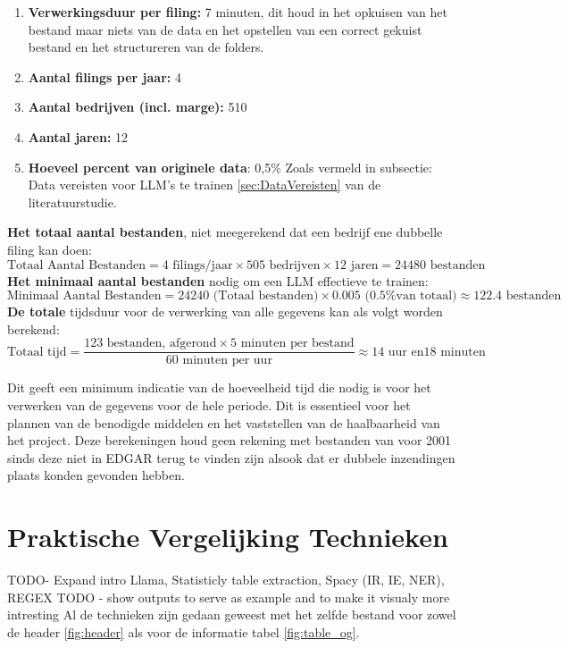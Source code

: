 \begin{enumerate}
    \item \textbf{Verwerkingsduur per filing:} 7 minuten, dit houd in het opkuisen van het bestand maar niets van de data en het opstellen van een correct gekuist bestand en het structureren van de folders.
    \item \textbf{Aantal filings per jaar:} 4
    \item \textbf{Aantal bedrijven (incl. marge):} 510
    \item \textbf{Aantal jaren:} 12
    \item \textbf{Hoeveel percent van originele data}: 0,5\% Zoals vermeld in subsectie: Data vereisten voor LLM's te trainen \ref{sec:DataVereisten} van de literatuurstudie.
\end{enumerate}

\textbf{Het totaal aantal bestanden}, niet meegerekend dat een bedrijf ene dubbelle filing kan doen:
\[
\text{Totaal Aantal Bestanden} = 4 \text{ filings/jaar} \times 505 \text{ bedrijven} \times 12 \text{ jaren} = 24480 \text{ bestanden}
\]
\textbf{Het minimaal aantal bestanden} nodig om een LLM effectieve te trainen:
\[
\text{Minimaal Aantal Bestanden} = 24240 \text{ (Totaal bestanden)} \times 0.005 \text{ (0.5\% van totaal)} \approx 122.4 \text{ bestanden}
\]
\textbf{De totale} tijdsduur voor de verwerking van alle gegevens kan als volgt worden berekend:
\[
\text{Totaal tijd} = \frac{123 \text{ bestanden, afgerond} \times 5 \text{ minuten per bestand}}{60 \text{ minuten per uur}} \approx 14 \text{ uur en}  18 \text{ minuten}
\]

Dit geeft een minimum indicatie van de hoeveelheid tijd die nodig is voor het verwerken van de gegevens voor de hele periode. Dit is essentieel voor het plannen van de benodigde middelen en het vaststellen van de haalbaarheid van het project. Deze berekeningen houd geen rekening met bestanden van voor 2001 sinds deze niet in EDGAR terug te vinden zijn alsook dat er dubbele inzendingen plaats konden gevonden hebben.



\section{Praktische Vergelijking Technieken}
TODO- Expand intro
Llama, Statisticly table extraction, Spacy (IR, IE, NER), REGEX
TODO - show outputs to serve as example and to make it visualy more intresting
Al de technieken zijn gedaan geweest met het zelfde bestand voor zowel de header \autoref{fig:header} als voor de informatie tabel \autoref{fig:table_og}.
